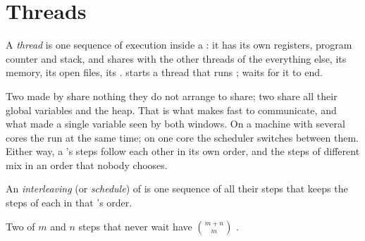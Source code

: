 \section{Threads}\label{sec:b2:threads-and-synchronisation:threads}

\begin{definition}[Thread]\label{def:b2:threads-and-synchronisation:thread}
A \emph{thread} is one sequence of execution inside a : it has its own registers, program counter
and stack, and shares with the other threads of the  everything else, its memory, its open files, its
.  starts a thread that runs ;
 waits for it to end.
\end{definition}

Two  made by  share nothing they do not arrange to share; two  share all their global
variables and the heap. That is what makes  fast to communicate, and what made  a single
variable seen by both windows. On a machine with several cores the  run at the same time; on one core the
scheduler switches between them. Either way, a 's steps follow each other in its own order, and the steps of
different  mix in an order that nobody chooses.

\begin{definition}[Interleaving]\label{def:b2:threads-and-synchronisation:interleaving}
An \emph{interleaving} (or \emph{schedule}) of  is one sequence of all their steps that keeps
the steps of each  in that 's order.
\end{definition}

\begin{proposition}\label{prop:b2:threads-and-synchronisation:interleavings}
Two  of $m$ and $n$ steps that never wait have $\binom{m+n}{m}$ .
\end{proposition}

